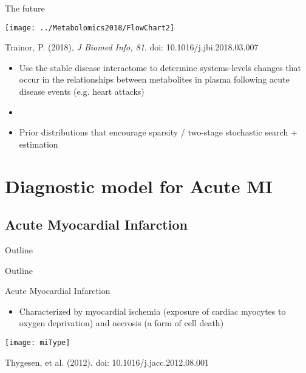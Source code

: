 \documentclass[xcolor=dvipsnames]{beamer}
\begin{document}
\begin{frame}{The future}
	\vspace{-15pt}
	\begin{center}
		\texttt{[image: ../Metabolomics2018/FlowChart2]}
		
		Trainor, P. (2018), \emph{J Biomed Info, 81}. doi: 10.1016/j.jbi.2018.03.007 \pause
	\end{center}
	\begin{itemize}
		\item Use the stable disease interactome to determine systems-levels changes that occur in the relationships between metabolites in plasma following acute disease events (e.g. heart attacks) \pause
		\item[]
		\item Prior distributions that encourage sparsity / two-stage stochastic search + estimation 
	\end{itemize}
\end{frame}

\section{Diagnostic model for Acute MI}
\subsection{Acute Myocardial Infarction}
\begin{frame}{Outline}
\vspace{-10.5pt}
\tableofcontents[currentsection,subsectionstyle=hide]
\end{frame}

\begin{frame}{Outline}
\vspace{-10.5pt}
\tableofcontents[currentsection,subsectionstyle=show/shaded/hide]
\end{frame}

\begin{frame}{Acute Myocardial Infarction}
\vspace{-5pt}
\begin{itemize}
\item Characterized by myocardial ischemia (exposure of cardiac myocytes to oxygen deprivation) and necrosis (a form of cell death)
\end{itemize}
\begin{center}
\texttt{[image: miType]}

Thygesen, et al. (2012). doi: 10.1016/j.jacc.2012.08.001
\end{center}
\end{frame}
\end{document}
